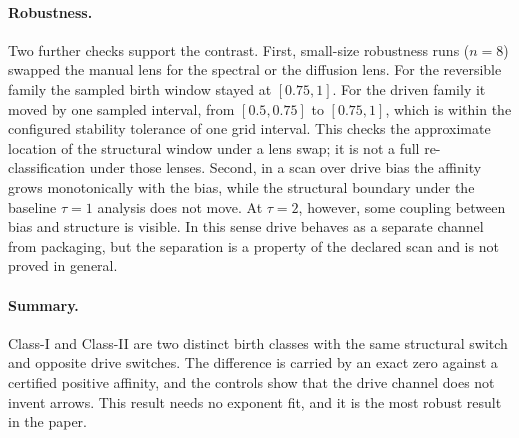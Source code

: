 \paragraph{Robustness.} Two further checks support the contrast. First, small-size robustness runs ($n=8$) swapped the manual lens for the spectral or the diffusion lens. For the reversible family the sampled birth window stayed at $[0.75,1]$. For the driven family it moved by one sampled interval, from $[0.5,0.75]$ to $[0.75,1]$, which is within the configured stability tolerance of one grid interval. This checks the approximate location of the structural window under a lens swap; it is not a full re-classification under those lenses. Second, in a scan over drive bias the affinity grows monotonically with the bias, while the structural boundary under the baseline $\tau=1$ analysis does not move. At $\tau=2$, however, some coupling between bias and structure is visible. In this sense drive behaves as a separate channel from packaging, but the separation is a property of the declared scan and is not proved in general.

\paragraph{Summary.} Class-I and Class-II are two distinct birth classes with the same structural switch and opposite drive switches. The difference is carried by an exact zero against a certified positive affinity, and the controls show that the drive channel does not invent arrows. This result needs no exponent fit, and it is the most robust result in the paper.
